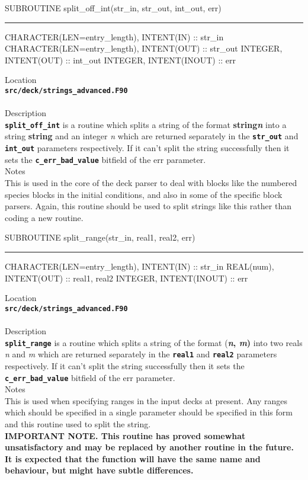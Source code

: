 \documentclass[12pt,a4paper]{article}
\newcommand{\HRule}{\rule[0.3cm]{\linewidth}{0.5mm}}
\newcommand{\inlinecode}[1]{{\color{warwickred} \bf\texttt{#1}}}
\begin{document}
\pagebreak
\begin{codedef}
SUBROUTINE split_off_int(str_in, str_out, int_out, err)
\HRule
CHARACTER(LEN=entry_length), INTENT(IN) :: str_in
CHARACTER(LEN=entry_length), INTENT(OUT) :: str_out
INTEGER, INTENT(OUT) :: int_out
INTEGER, INTENT(INOUT) :: err
\end{codedef}
\vspace{1cm}
{\Large Location\\}
\inlinecode{src/deck/strings\_advanced.F90}\\
\\[0.5cm]
{\Large Description\\}
\inlinecode{split\_off\_int} is a routine which splits a string of the format
{\bf string{\it n}} into a string {\bf string} and an integer {\it n} which are
returned separately in the \inlinecode{str\_out} and \inlinecode{int\_out}
parameters respectively.  If it can't split the string successfully then it
sets the \inlinecode{c\_err\_bad\_value} bitfield of the err parameter.
\\[0.5cm]
{\Large Notes\\}
This is used in the core of the deck parser to deal with blocks like the
numbered species blocks in the initial conditions, and also in some of the
specific block parsers. Again, this routine should be used to split strings
like this rather than coding a new routine.

\pagebreak
\begin{codedef}
SUBROUTINE split_range(str_in, real1, real2, err)
\HRule
CHARACTER(LEN=entry_length), INTENT(IN) :: str_in
REAL(num), INTENT(OUT) :: real1, real2
INTEGER, INTENT(INOUT) :: err
\end{codedef}
\vspace{1cm}
{\Large Location\\}
\inlinecode{src/deck/strings\_advanced.F90}\\
\\[0.5cm]
{\Large Description\\}
\inlinecode{split\_range} is a routine which splits a string of the format
{(\bf{\it n}, {\it m})} into two reals {\it n} and {\it m} which are returned
separately in the \inlinecode{real1} and \inlinecode{real2} parameters
respectively.  If it can't split the string successfully then it sets the
\inlinecode{c\_err\_bad\_value} bitfield of the err parameter.
\\[0.5cm]
{\Large Notes\\}
This is used when specifying ranges in the input decks at present. Any
ranges which should be specified in a single parameter should be specified in
this form and this routine used to split the string.\\ {\bf IMPORTANT NOTE. This
routine has proved somewhat unsatisfactory and may be replaced by another
routine in the future. It is expected that the function will have the same name
and behaviour, but might have subtle differences.}
\end{document}
